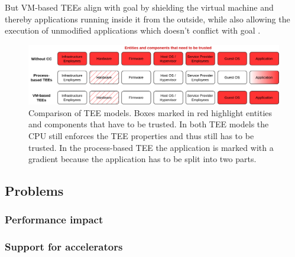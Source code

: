 But VM-based TEEs align with goal  by shielding the virtual
machine and thereby applications running inside it from the outside, while also
allowing the execution of unmodified applications which doesn't conflict with
goal .

\begin{figure}
  \centering
  \includegraphics[width=\linewidth]{resources/cc-tee-comparison.png}
  \caption[Comparison of trusted execution environment models]{
    Comparison of TEE models. Boxes marked in red highlight entities and
    components that have to be trusted. In both TEE models the CPU still
    enforces the TEE properties and thus still has to be trusted. In the
    process-based TEE the application is marked with a gradient because the
    application has to be split into two parts.
  }
  \label{figure:cc-tee-comparison}
\end{figure}

\subsection{Problems}

\subsubsection{Performance impact}


\subsubsection{Support for accelerators}


